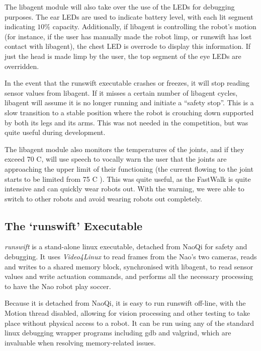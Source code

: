 \documentclass[pdftex,11pt,a4paper]{report}
\begin{document}
The libagent module will also take over the use of the LEDs for debugging
purposes. The ear LEDs are used to indicate battery level, with each lit
segment indicating $10\%$ capacity. Additionally, if libagent is
controlling the robot's motion (for instance, if the user has manually made
the robot limp, or runswift has lost contact with libagent), the chest LED
is overrode to display this information. If just the head is made limp by
the user, the top segment of the eye LEDs are overridden.

In the event that the runswift executable crashes or freezes, it will stop
reading sensor values from libagent. If it misses a certain number of
libagent cycles, libagent will assume it is no longer running and initiate
a ``safety stop''. This is a slow transition to a stable position where the
robot is crouching down supported by both its legs and its arms. This was
not needed in the competition, but was quite useful during development.

The libagent module also monitors the temperatures of the joints, and if
they exceed 70 \textdegree C, will use speech to vocally warn the user that
the joints are approaching the upper limit of their functioning (the
current flowing to the joint starts to be limited from 75 \textdegree C
\cite{aldebaran10developer}). This was quite useful, as the FastWalk is
quite intensive and can quickly wear robots out.  With the warning, we were
able to switch to other robots and avoid wearing robots out completely.

\subsection{The `runswift' Executable}\label{sectionrUNSWiftExecutable}

\emph{runswift} is a stand-alone linux executable, detached from NaoQi for safety and debugging. It uses \emph{Video4Linux} to read frames from the Nao's two cameras, reads and writes to a shared memory block, synchronised with libagent, to read sensor values and write actuation commands, and performs all the necessary processing to have the Nao robot play soccer.

Because it is detached from NaoQi, it is easy to run runswift off-line, with the Motion thread disabled, allowing for vision processing and other testing to take place without physical access to a robot. It can be run using any of the standard linux debugging wrapper programs including gdb and valgrind, which are invaluable when resolving memory-related issues.
\end{document}

